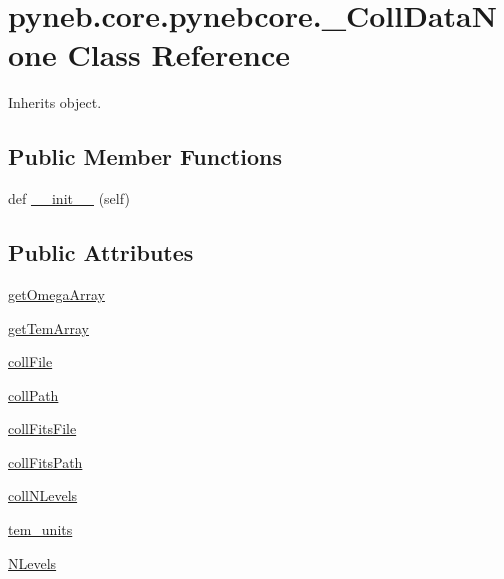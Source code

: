 \hypertarget{classpyneb_1_1core_1_1pynebcore_1_1___coll_data_none}{}\section{pyneb.\+core.\+pynebcore.\+\_\+\+Coll\+Data\+None Class Reference}
\label{classpyneb_1_1core_1_1pynebcore_1_1___coll_data_none}


Inherits object.

\subsection*{Public Member Functions}
\begin{DoxyCompactItemize}
\item 
def \hyperlink{classpyneb_1_1core_1_1pynebcore_1_1___coll_data_none_aef4857135bf4c5ac4ee281c3872a7ae1}{\+\_\+\+\_\+init\+\_\+\+\_\+} (self)
\end{DoxyCompactItemize}
\subsection*{Public Attributes}
\begin{DoxyCompactItemize}
\item 
\hyperlink{classpyneb_1_1core_1_1pynebcore_1_1___coll_data_none_a9945656d527d539b02443f1e12175952}{get\+Omega\+Array}
\item 
\hyperlink{classpyneb_1_1core_1_1pynebcore_1_1___coll_data_none_a75bd94e0404dbdad86ce0cd849331b6d}{get\+Tem\+Array}
\item 
\hyperlink{classpyneb_1_1core_1_1pynebcore_1_1___coll_data_none_a921566608d3f514d075992b0c6870952}{coll\+File}
\item 
\hyperlink{classpyneb_1_1core_1_1pynebcore_1_1___coll_data_none_a3e39b0e757b0987e39ad0257a981ff13}{coll\+Path}
\item 
\hyperlink{classpyneb_1_1core_1_1pynebcore_1_1___coll_data_none_acb2dc662b7ca086e2d3322b79993fc60}{coll\+Fits\+File}
\item 
\hyperlink{classpyneb_1_1core_1_1pynebcore_1_1___coll_data_none_ad3bac87fe373ebf85361cc6c86b25c97}{coll\+Fits\+Path}
\item 
\hyperlink{classpyneb_1_1core_1_1pynebcore_1_1___coll_data_none_aa6cfd6d6afa856ba4c102acc9180df42}{coll\+N\+Levels}
\item 
\hyperlink{classpyneb_1_1core_1_1pynebcore_1_1___coll_data_none_afc8b4905545401491edcb56c8f0b556e}{tem\+\_\+units}
\item 
\hyperlink{classpyneb_1_1core_1_1pynebcore_1_1___coll_data_none_a194d717f8c873199de6a3e0cb7d7a96b}{N\+Levels}
\end{DoxyCompactItemize}


